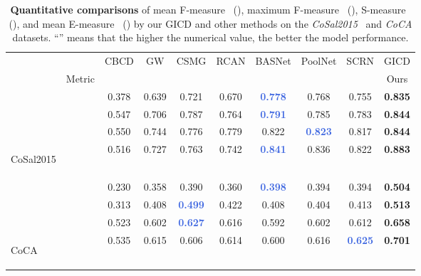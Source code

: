 \documentclass[runningheads,orivec]{llncs}
\newcommand{\trb}[1]{\textbf{\textcolor{RedOrange}{#1}}}
\newcommand{\tbb}[1]{{\textbf{\textcolor{RoyalBlue}{#1}}}}
\begin{document}
\begin{table}[t!]
	\centering
\footnotesize
\renewcommand{\arraystretch}{1.25}
	\renewcommand{\tabcolsep}{1.6mm}
	\begin{tabular}{lr|cccc|ccc|c}
		\hline\toprule
		&          &    CBCD              &  GW         &   CSMG                 &   RCAN      &  BASNet  &  PoolNet  &    SCRN  &    GICD  \\
		&  Metric  & \cite{fu2013cluster} &  \cite{wei2017gw} &  \cite{zhang2019CSMG}  &  \cite{li2019detecting}  & \cite{qin2019basnet} &  \cite{liu2019poolnet}  &  \cite{wu2019SCRN}  &  \scriptsize{Ours}  \\
\hline
&      & 0.378 &  0.639 &  0.721      &  0.670 & \tbb{0.778} & 0.768 & 0.755 &  \trb{0.835} \\
		&   & 0.547 & 0.706 & 0.787 & 0.764 & \tbb{0.791} & 0.785 & 0.783 &  \trb{0.844} \\
&     & 0.550 &  0.744 &  0.776      &  0.779 & 0.822 & \tbb{0.823} & 0.817 &  \trb{0.844} \\
		\multirow{-4}{*}{\begin{sideways}CoSal2015\end{sideways}}
		&        & 0.516 &  0.727 &  0.763       &  0.742 & \tbb{0.841} & 0.836 & 0.822 &  \trb{0.883} \\
\hline
&      & 0.230 &  0.358 &  0.390       &  0.360 & \tbb{0.398} & 0.394 & 0.394       & \trb{0.504} \\
		&   & 0.313 & 0.408 & \tbb{0.499} & 0.422 & 0.408 & 0.404 & 0.413 &  \trb{0.513} \\
&     & 0.523 &  0.602 &  \tbb{0.627} &  0.616 & 0.592       & 0.602 & 0.612       & \trb{0.658} \\
		\multirow{-4}{*}{\begin{sideways}CoCA\end{sideways}}
		&        & 0.535 &  0.615 &  0.606       &  0.614 & 0.600       & 0.616 & \tbb{0.625} & \trb{0.701} \\
		\bottomrule
	\end{tabular}
	\caption{
		\textbf{Quantitative comparisons} of mean F-measure~\cite{achanta2009frequency} (),
		maximum F-measure~\cite{borji2015SalObjBenchmark} (),
		S-measure~\cite{fan2017structure} (),
		and mean E-measure~\cite{Fan2018Enhanced} () by our GICD and other methods on the \textit{CoSal2015}~\cite{zhang2016CoSal} 
		and \textit{CoCA} datasets.
``'' means that the higher the numerical value, the better the model performance.
	}
	\label{tab:Results}
\end{table}
\end{document}
